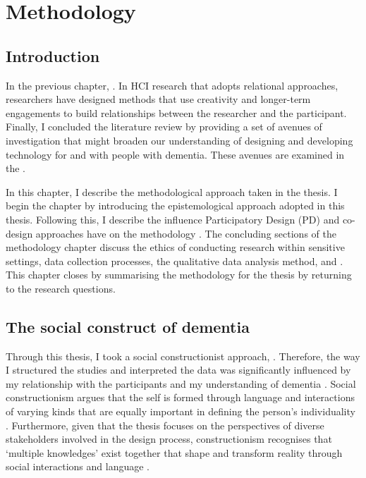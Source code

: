 \chapter{Methodology}
\label{Methodology}

\section{Introduction}
\label{Method:Intro}
In the previous chapter, . In HCI research that adopts relational approaches, researchers have designed methods that use creativity and longer-term engagements to build relationships between the researcher and the participant. Finally, I concluded the literature review by providing a set of avenues of investigation that might broaden our understanding of designing and developing technology for and with people with dementia. These avenues are examined in the .

In this chapter, I describe the methodological approach taken in the thesis. I begin the chapter by introducing the epistemological approach adopted in this thesis. Following this, I describe the influence Participatory Design (PD) and co-design approaches have on the methodology \citep{duarte2018participatory}. The concluding sections of the methodology chapter discuss the ethics of conducting research within sensitive settings, data collection processes, the qualitative data analysis method, and . This chapter closes by summarising the methodology for the thesis by returning to the research questions.  

\section{The social construct of dementia}
\label{social construct}
Through this thesis, I took a social constructionist approach, . Therefore, the way I structured the studies and interpreted the data was significantly influenced by my relationship with the participants and my understanding of dementia \citep{surr2006preservation}. Social constructionism argues that the self is formed through language and interactions of varying kinds that are equally important in defining the person's individuality \citep{sarup1996identity}. Furthermore, given that the thesis focuses on the perspectives of diverse stakeholders involved in the design process, constructionism recognises that `multiple knowledges' exist together that shape and transform reality through social interactions and language \citep{mckeown2015you}.

